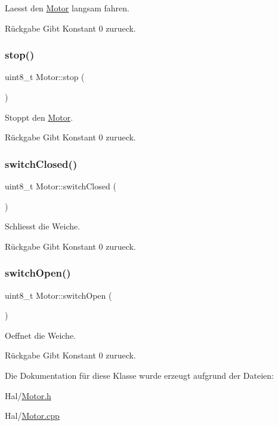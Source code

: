 Laesst den \hyperlink{class_motor}{Motor} langsam fahren.

\begin{DoxyReturn}{Rückgabe}
Gibt Konstant 0 zurueck. 
\end{DoxyReturn}
\hypertarget{class_motor_aab732159d4adf537bbcd3bcf9371d03b}{}\label{class_motor_aab732159d4adf537bbcd3bcf9371d03b} 
\subsubsection{\texorpdfstring{stop()}{stop()}}
{\footnotesize\ttfamily uint8\+\_\+t Motor\+::stop (\begin{DoxyParamCaption}{ }\end{DoxyParamCaption})}

Stoppt den \hyperlink{class_motor}{Motor}.

\begin{DoxyReturn}{Rückgabe}
Gibt Konstant 0 zurueck. 
\end{DoxyReturn}
\hypertarget{class_motor_a38af68cbad8be09b85afc86f156f0f89}{}\label{class_motor_a38af68cbad8be09b85afc86f156f0f89} 
\subsubsection{\texorpdfstring{switch\+Closed()}{switchClosed()}}
{\footnotesize\ttfamily uint8\+\_\+t Motor\+::switch\+Closed (\begin{DoxyParamCaption}{ }\end{DoxyParamCaption})}

Schliesst die Weiche.

\begin{DoxyReturn}{Rückgabe}
Gibt Konstant 0 zurueck. 
\end{DoxyReturn}
\hypertarget{class_motor_a35c0d7c6350b9f670dc243d31ea40263}{}\label{class_motor_a35c0d7c6350b9f670dc243d31ea40263} 
\subsubsection{\texorpdfstring{switch\+Open()}{switchOpen()}}
{\footnotesize\ttfamily uint8\+\_\+t Motor\+::switch\+Open (\begin{DoxyParamCaption}{ }\end{DoxyParamCaption})}

Oeffnet die Weiche.

\begin{DoxyReturn}{Rückgabe}
Gibt Konstant 0 zurueck. 
\end{DoxyReturn}


Die Dokumentation für diese Klasse wurde erzeugt aufgrund der Dateien\+:\begin{DoxyCompactItemize}
\item 
Hal/\hyperlink{_motor_8h}{Motor.\+h}\item 
Hal/\hyperlink{_motor_8cpp}{Motor.\+cpp}\end{DoxyCompactItemize}
